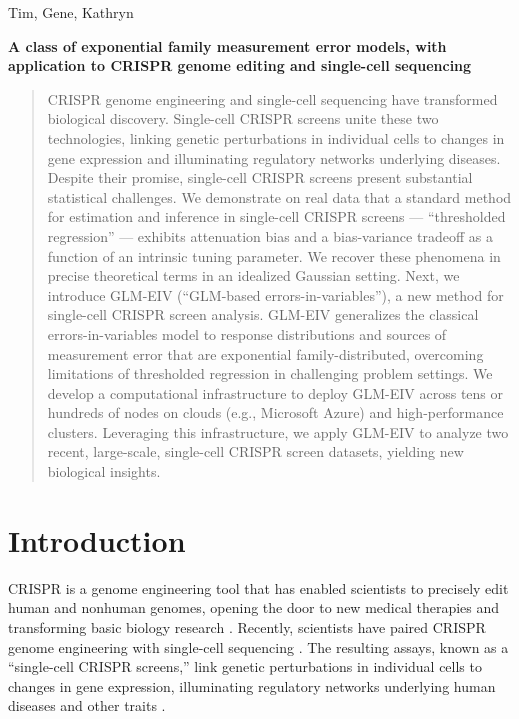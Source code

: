 \documentclass[12pt]{article}
\begin{document}
\noindent
Tim, Gene, Kathryn
\begin{center} 
\textbf{A class of exponential family measurement error models, with application to CRISPR genome editing and single-cell sequencing}
\end{center}

\begin{abstract}
CRISPR genome engineering and single-cell sequencing have transformed biological discovery. Single-cell CRISPR screens unite these two technologies, linking genetic perturbations in individual cells to changes in gene expression and illuminating regulatory networks underlying diseases. Despite their promise, single-cell CRISPR screens present substantial statistical challenges. We demonstrate on real data that a standard method for estimation and inference in single-cell CRISPR screens — “thresholded regression” — exhibits attenuation bias and a bias-variance tradeoff as a function of an intrinsic tuning parameter. We recover these phenomena in precise theoretical terms in an idealized Gaussian setting. Next, we introduce GLM-EIV (``GLM-based errors-in-variables''), a new method for single-cell CRISPR screen analysis. GLM-EIV generalizes the classical errors-in-variables model to response distributions and sources of measurement error that are exponential family-distributed, overcoming limitations of thresholded regression in challenging problem settings. We develop a computational infrastructure to deploy GLM-EIV across tens or hundreds of nodes on clouds (e.g., Microsoft Azure) and high-performance clusters. Leveraging this infrastructure, we apply GLM-EIV to analyze two recent, large-scale, single-cell CRISPR screen datasets, yielding new biological insights.
\end{abstract}
\tableofcontents
\newpage
\section{Introduction}
CRISPR is a genome engineering tool that has enabled scientists to precisely edit human and nonhuman genomes, opening the door to new medical therapies \cite{Rothgangl2021,Musunuru2021} and transforming basic biology research \cite{Przybyla2021}. Recently, scientists have paired CRISPR genome engineering with single-cell sequencing \cite{Dixit2016,Datlinger2017}. The resulting assays, known as a ``single-cell CRISPR screens,'' link genetic perturbations in individual cells to changes in gene expression, illuminating regulatory networks underlying human diseases and other traits \cite{Morris2021a}.
\end{document}
